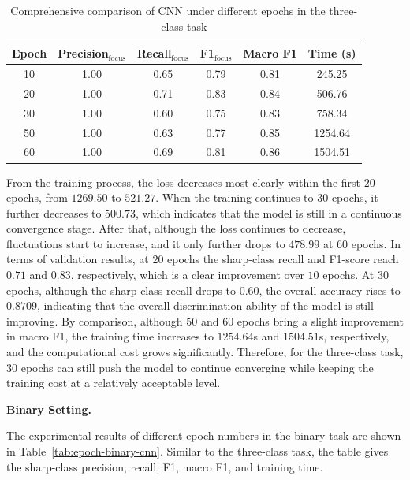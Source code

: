 \begin{table}[htbp]
    \centering
    \caption{Comprehensive comparison of CNN under different epochs in the three-class task}
    \label{tab:epoch-triclass-cnn}
    \begin{tabular}{cccccc}
        \toprule
        Epoch & Precision$_{\mathrm{focus}}$ & Recall$_{\mathrm{focus}}$ &
        F1$_{\mathrm{focus}}$ & Macro F1 & Time (s) \\
        \midrule
        10 & 1.00 & 0.65 & 0.79 & 0.81 & 245.25  \\
        20 & 1.00 & 0.71 & 0.83 & 0.84 & 506.76  \\
        30 & 1.00 & 0.60 & 0.75 & 0.83 & 758.34  \\
        50 & 1.00 & 0.63 & 0.77 & 0.85 & 1254.64 \\
        60 & 1.00 & 0.69 & 0.81 & 0.86 & 1504.51 \\
        \bottomrule
    \end{tabular}
\end{table}

\par From the training process, the loss decreases most clearly within the
first $20$ epochs, from $1269.50$ to $521.27$. When the training continues to
$30$ epochs, it further decreases to $500.73$, which indicates that the model
is still in a continuous convergence stage. After that, although the loss
continues to decrease, fluctuations start to increase, and it only further
drops to $478.99$ at $60$ epochs. In terms of validation results, at $20$
epochs the sharp-class recall and F1-score reach $0.71$ and $0.83$,
respectively, which is a clear improvement over $10$ epochs. At $30$ epochs,
although the sharp-class recall drops to $0.60$, the overall accuracy rises to
$0.8709$, indicating that the overall discrimination ability of the model is
still improving. By comparison, although $50$ and $60$ epochs bring a slight
improvement in macro F1, the training time increases to $1254.64$s and
$1504.51$s, respectively, and the computational cost grows significantly.
Therefore, for the three-class task, $30$ epochs can still push the model to
continue converging while keeping the training cost at a relatively acceptable
level.

\par\medskip \noindent\textbf{Binary Setting.} \par The experimental results of
different epoch numbers in the binary task are shown in
Table~\ref{tab:epoch-binary-cnn}. Similar to the three-class task, the table
gives the sharp-class precision, recall, F1, macro F1, and training time.

